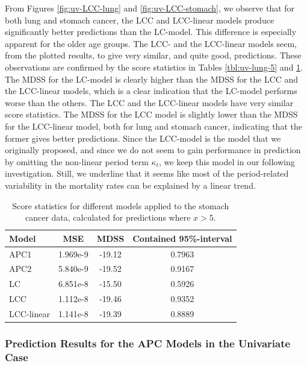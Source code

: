 \newpar From Figures \ref{fig:uv-LCC-lung} and \ref{fig:uv-LCC-stomach}, we observe that for both lung and stomach cancer, the LCC and LCC-linear models produce significantly better predictions than the LC-model. This difference is especially apparent for the older age groups. The LCC- and the LCC-linear models seem, from the plotted results, to give very similar, and quite good, predictions. These observations are confirmed by the score statistics in Tables \ref{tbl:uv-lung-5} and \ref{tbl:uv-stomach-5}. The MDSS for the LC-model is clearly higher than the MDSS for the LCC and the LCC-linear models, which is a clear indication that the LC-model performs worse than the others. The LCC and the LCC-linear models have very similar score statistics. The MDSS for the LCC model is slightly lower than the MDSS for the LCC-linear model, both for lung and stomach cancer, indicating that the former gives better predictions. Since the LCC-model is the model that we originally proposed, and since we do not seem to gain performance in prediction by omitting the non-linear period term $\kappa_t$, we keep this model in our following investigation. Still, we underline that it seems like most of the period-related variability in the mortality rates can be explained by a linear trend.

\begin{table}
    \begin{center}
        \begin{tabular}{l |c c c }
            Model & MSE &   MDSS & Contained 95\%-interval\\
            \hline
            APC1     & 1.969e-9 & -19.12    & 0.7963 \\
            APC2     & 5.840e-9 & -19.52    & 0.9167 \\
            LC      & 6.851e-8 & -15.50    & 0.5926 \\
            LCC     & 1.112e-8 & -19.46    & 0.9352 \\
            LCC-linear      & 1.141e-8 & -19.39    & 0.8889
        \end{tabular}
        \caption{Score statistics for different models applied to the stomach cancer data, calculated for predictions where $x > 5$.}\label{tbl:uv-stomach-5}
    \end{center}
\end{table}

\subsubsection{Prediction Results for the APC Models in the Univariate Case}

